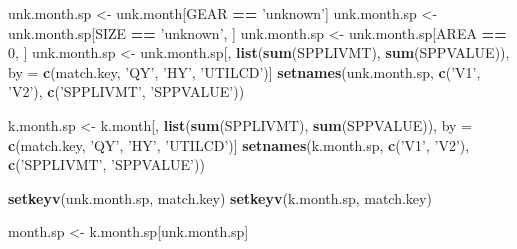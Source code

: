 \documentclass[]{article}
\newenvironment{Shaded}{\begin{snugshade}}{\end{snugshade}}
\newcommand{\KeywordTok}[1]{\textcolor[rgb]{0.13,0.29,0.53}{\textbf{#1}}}
\newcommand{\DecValTok}[1]{\textcolor[rgb]{0.00,0.00,0.81}{#1}}
\newcommand{\StringTok}[1]{\textcolor[rgb]{0.31,0.60,0.02}{#1}}
\newcommand{\OperatorTok}[1]{\textcolor[rgb]{0.81,0.36,0.00}{\textbf{#1}}}
\newcommand{\NormalTok}[1]{#1}
\begin{document}
\begin{Shaded}
\begin{Highlighting}[]
\NormalTok{  unk.month.sp <-}\StringTok{ }\NormalTok{unk.month[GEAR }\OperatorTok{==}\StringTok{ 'unknown'}\NormalTok{]}
\NormalTok{  unk.month.sp <-}\StringTok{ }\NormalTok{unk.month.sp[SIZE }\OperatorTok{==}\StringTok{ 'unknown'}\NormalTok{, ]}
\NormalTok{  unk.month.sp <-}\StringTok{ }\NormalTok{unk.month.sp[AREA }\OperatorTok{==}\StringTok{ }\DecValTok{0}\NormalTok{, ]}
\NormalTok{  unk.month.sp <-}\StringTok{ }\NormalTok{unk.month.sp[, }\KeywordTok{list}\NormalTok{(}\KeywordTok{sum}\NormalTok{(SPPLIVMT), }\KeywordTok{sum}\NormalTok{(SPPVALUE)), }
\NormalTok{                               by =}\StringTok{ }\KeywordTok{c}\NormalTok{(match.key, }\StringTok{'QY'}\NormalTok{, }\StringTok{'HY'}\NormalTok{, }\StringTok{'UTILCD'}\NormalTok{)]}
  \KeywordTok{setnames}\NormalTok{(unk.month.sp, }\KeywordTok{c}\NormalTok{(}\StringTok{'V1'}\NormalTok{, }\StringTok{'V2'}\NormalTok{), }\KeywordTok{c}\NormalTok{(}\StringTok{'SPPLIVMT'}\NormalTok{, }\StringTok{'SPPVALUE'}\NormalTok{))}
  
\NormalTok{  k.month.sp <-}\StringTok{ }\NormalTok{k.month[, }\KeywordTok{list}\NormalTok{(}\KeywordTok{sum}\NormalTok{(SPPLIVMT), }\KeywordTok{sum}\NormalTok{(SPPVALUE)), }
\NormalTok{                        by =}\StringTok{ }\KeywordTok{c}\NormalTok{(match.key, }\StringTok{'QY'}\NormalTok{, }\StringTok{'HY'}\NormalTok{, }\StringTok{'UTILCD'}\NormalTok{)]}
  \KeywordTok{setnames}\NormalTok{(k.month.sp, }\KeywordTok{c}\NormalTok{(}\StringTok{'V1'}\NormalTok{, }\StringTok{'V2'}\NormalTok{), }\KeywordTok{c}\NormalTok{(}\StringTok{'SPPLIVMT'}\NormalTok{, }\StringTok{'SPPVALUE'}\NormalTok{))}
  
  \KeywordTok{setkeyv}\NormalTok{(unk.month.sp, match.key)}
  \KeywordTok{setkeyv}\NormalTok{(k.month.sp,   match.key)}
  
\NormalTok{  month.sp <-}\StringTok{ }\NormalTok{k.month.sp[unk.month.sp]}
  

\end{Highlighting}
\end{Shaded}
\end{document}
